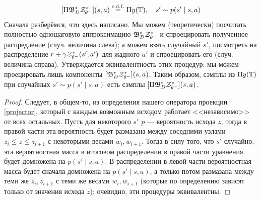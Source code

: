 \begin{theorem}
\begin{equation}\label{projectioncomponents}
[\Pi \mathfrak{B}^*_D \mathcal{Z}^*_{\theta^-}](s, a) \mathrel{\stackrel{\mathrm{c.d.f.}}=} \Pi y(\mathbb{T}), \quad s' \sim p(s' \mid s, a)
\end{equation}
\beginproof[Пояснение]
Сначала разберёмся, что здесь написано. Мы можем (теоретически) посчитать полностью одношаговую аппроксимацию $\mathfrak{B}^*_D \mathcal{Z}^*_{\theta^-}$ и спроецировать полученное распредление (случ. величина слева); а можем взять случайный $s'$, посмотреть на распределение $r + \gamma\mathcal{Z}^*_{\theta^-}(s', a')$ для жадного $a'$ и спроецировать его (случ. величина справа). Утверждается эквивалентность этих процедур: мы можем проецировать лишь компоненты $[\mathfrak{B}^*_D \mathcal{Z}^*_{\theta^-}](s, a)$. Таким образом, сэмплы из $\Pi y(\mathbb{T})$ при случайных $s' \sim p(s' \mid s, a)$ есть сэмплы $[\Pi \mathfrak{B}^*_D \mathcal{Z}^*_{\theta^-}](s, a)$.

\begin{proof} Следует, в общем-то, из определения нашего оператора проекции \eqref{projector}, который с каждым возможным исходом работает <<независимо>> от всех остальных. Пусть для некоторого $s'$ $p$ --- вероятность исхода $z$, тогда в правой части эта вероятность будет размазана между соседними узлами $z_i \le z \le z_{i+1}$ с некоторыми весами $w_i, w_{i+1}$. Тогда в силу того, что $s'$ случайно, эта вероятностная масса в итоговом распределении в правой части уравнения будет домножена на $p(s' \mid s, a)$. В распределении в левой части вероятностная масса будет сначала домножена на $p(s' \mid s, a)$, а только потом размазана между теми же $z_i, z_{i+1}$ с теми же весами $w_i, w_{i+1}$ (которые по определению зависят только от значения исхода $z$); очевидно, эти процедуры эквивалентны.
\end{proof}
\end{theorem}

